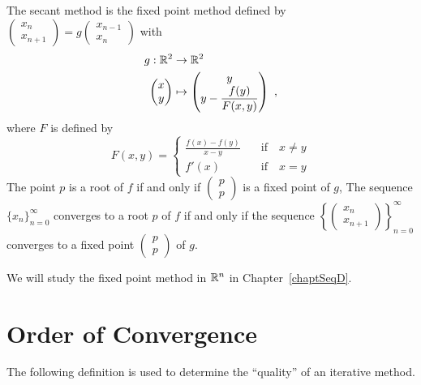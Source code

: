 \begin{rmk}
The secant method is the fixed point method defined by
$\displaystyle
\begin{pmatrix} x_n \\ x_{n+1} \end{pmatrix}
= g\begin{pmatrix} x_{n-1}\\ x_n \end{pmatrix}$
with
\begin{align*}
g:\mathbb{R}^2 &\rightarrow \mathbb{R}^2 \\
\
\begin{pmatrix} x \\ y \end{pmatrix}
&\mapsto
\begin{pmatrix}
y \\ 
\displaystyle y - \frac{f(y)}{F(x,y)}
\end{pmatrix} \ ,
\end{align*}
where $F$ is defined by
\[
F(x,y) = \begin{cases}
\displaystyle \frac{f(x)-f(y)}{x-y} & \quad \text{if} \quad x\neq y \\
f'(x) & \quad \text{if} \quad x = y
\end{cases}
\]
The point $p$ is a root of $f$ if and only if
$\displaystyle \begin{pmatrix} p \\ p \end{pmatrix}$ is a fixed point
of $g$,  The sequence $\{x_n\}_{n=0}^\infty$ converges to a root $p$ of $f$
if and only if the sequence
$\displaystyle \left\{ \begin{pmatrix} x_n \\
    x_{n+1} \end{pmatrix}\right\}_{n=0}^\infty$ 
converges to a fixed point
$\displaystyle \begin{pmatrix} p \\ p \end{pmatrix}$  of $g$.

We will study the fixed point method in $\mathbb{R}^n$ in Chapter~\ref{chaptSeqD}.
\label{secantFP}
\end{rmk}

\section{Order of Convergence} \label{OrderConvNBmeth}

The following definition is used to determine the ``quality'' of an
iterative method.

